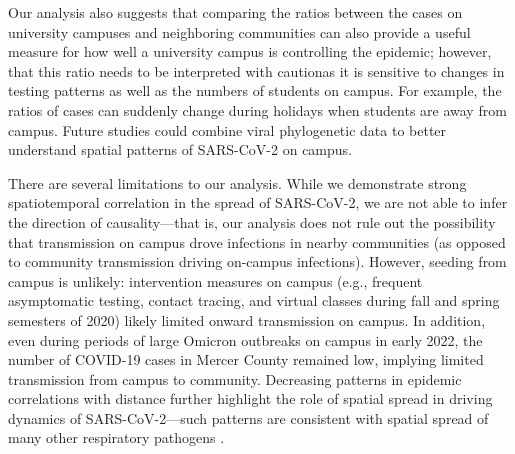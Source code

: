 \documentclass[12pt]{article}
\providecommand{\DIFaddtex}[1]{{\protect\color{blue}\uwave{#1}}} %
\providecommand{\DIFaddbegin}{} %
\providecommand{\DIFaddend}{} %
\providecommand{\DIFadd}[1]{\texorpdfstring{\DIFaddtex{#1}}{#1}} %
\newcommand{\DIFaddincludegraphics}[2][]{{\color{blue}\fbox{\DIFOincludegraphics[#1]{#2}}}} %
\DeclareRobustCommand{\DIFaddbegin}{\DIFOaddbegin \let\includegraphics\DIFaddincludegraphics} %
\DeclareRobustCommand{\DIFaddend}{\DIFOaddend \let\includegraphics\DIFOincludegraphics} %
\begin{document}
Our analysis also suggests that comparing the ratios between the cases on university campuses and neighboring communities can also provide a useful measure for how well a university campus is controlling the epidemic; 
however, that this ratio needs to be interpreted with caution\DIFaddbegin \DIFadd{, }\DIFaddend as it is sensitive to changes in testing patterns as well as the numbers of students on campus.
For example, the ratios of cases can suddenly change during holidays when students are away from campus.
Future studies could combine viral phylogenetic data to better understand spatial patterns of SARS-CoV-2 on campus.

There are several limitations to our analysis.
While we demonstrate strong spatiotemporal correlation in the spread of SARS-CoV-2, we are not able to infer the direction of causality---that is, our analysis does not rule out the possibility that transmission on campus drove infections in nearby communities (as opposed to community transmission driving on-campus infections).
However, seeding from campus is unlikely: 
intervention measures on campus (e.g., frequent asymptomatic testing, contact tracing, and virtual classes during fall and spring semesters of 2020) likely limited onward transmission on campus.
In addition, even during periods of large Omicron outbreaks on campus in early 2022, the number of COVID-19 cases in Mercer County remained low, implying limited transmission from campus to community.
Decreasing patterns in epidemic correlations with distance further highlight the role of spatial spread in driving dynamics of SARS-CoV-2---such patterns are consistent with spatial spread of many other respiratory pathogens \citep{grenfell2001travelling, viboud2006synchrony, baker2019epidemic}.
\end{document}
